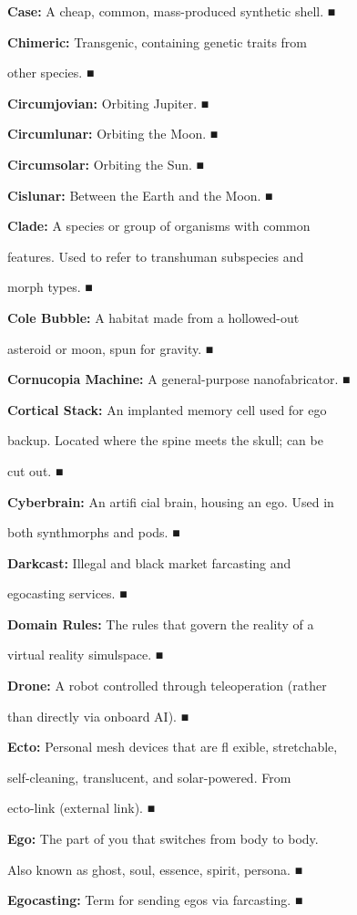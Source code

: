 \textbf{ Case:} A cheap, common, mass-produced synthetic shell.
■

\textbf{ Chimeric:} Transgenic, containing genetic traits from 

other species.
■

\textbf{ Circumjovian:} Orbiting Jupiter.
■

\textbf{ Circumlunar:} Orbiting the Moon.
■

\textbf{ Circumsolar:} Orbiting the Sun.
■

\textbf{ Cislunar:} Between the Earth and the Moon.
■

\textbf{ Clade:} A species or group of organisms with common 

features. Used to refer to transhuman subspecies and 

morph types. 
■

\textbf{ Cole Bubble:} A habitat made from a hollowed-out 

asteroid or moon, spun for gravity.
■

\textbf{ Cornucopia Machine:} A general-purpose nanofabricator.
■

\textbf{ Cortical Stack:} An implanted memory cell used for ego 

backup. Located where the spine meets the skull; can be 

cut out.
■

\textbf{ Cyberbrain:} An artiﬁ cial brain, housing an ego. Used in 

both synthmorphs and pods.
■

\textbf{ Darkcast:} Illegal and black market farcasting and 

egocasting services.
■

\textbf{ Domain Rules:} The rules that govern the reality of a 

virtual reality simulspace.
■

\textbf{ Drone:} A robot controlled through teleoperation (rather 

than directly via onboard AI).
■

\textbf{ Ecto:} Personal mesh devices that are ﬂ exible, stretchable, 

self-cleaning, translucent, and solar-powered. From 

ecto-link (external link).
■

\textbf{ Ego:} The part of you that switches from body to body. 

Also known as ghost, soul, essence, spirit, persona.
■

\textbf{ Egocasting:} Term for sending egos via farcasting.
■

